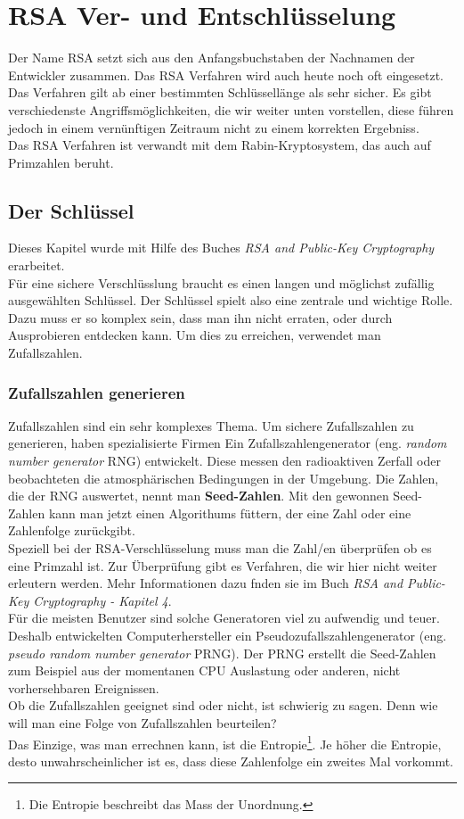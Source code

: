 \newpage
\section{RSA Ver- und Entschlüsselung}
Der Name RSA setzt sich aus den Anfangsbuchstaben der Nachnamen der Entwickler zusammen. Das RSA Verfahren wird auch heute noch oft eingesetzt. Das Verfahren gilt ab einer bestimmten Schlüssellänge als sehr sicher. Es gibt verschiedenste Angriffsmöglichkeiten, die wir weiter unten vorstellen, diese führen jedoch in einem vernünftigen Zeitraum nicht zu einem korrekten Ergebniss.\\
Das RSA Verfahren ist verwandt mit dem Rabin-Kryptosystem, das auch auf Primzahlen beruht. %

\subsection{Der Schlüssel}
Dieses Kapitel wurde mit Hilfe des Buches \textit{RSA and Public-Key Cryptography} erarbeitet.\\[2ex]
%
Für eine sichere Verschlüsslung braucht es einen langen und möglichst zufällig ausgewählten Schlüssel. Der Schlüssel spielt also eine zentrale und wichtige Rolle. Dazu muss er so komplex sein, dass man ihn nicht erraten, oder durch Ausprobieren entdecken kann. Um dies zu erreichen, verwendet man Zufallszahlen.
%
\subsubsection{Zufallszahlen generieren}
Zufallszahlen sind ein sehr komplexes Thema. Um sichere Zufallszahlen zu generieren, haben spezialisierte Firmen Ein Zufallszahlengenerator (eng. \textit{random number generator} RNG) entwickelt. Diese messen den radioaktiven Zerfall oder beobachteten die atmosphärischen Bedingungen in der Umgebung. Die Zahlen, die der RNG auswertet, nennt man \textbf{Seed-Zahlen}. Mit den gewonnen Seed-Zahlen kann man jetzt einen Algorithums füttern, der eine Zahl oder eine Zahlenfolge zurückgibt.\\
Speziell bei der RSA-Verschlüsselung muss man die Zahl/en überprüfen ob es eine Primzahl ist. Zur Überprüfung gibt es Verfahren, die wir hier nicht weiter erleutern werden. Mehr Informationen dazu fnden sie im Buch \textit{RSA and Public-Key Cryptography - Kapitel 4}.\\
%
Für die meisten Benutzer sind solche Generatoren viel zu aufwendig und teuer. Deshalb entwickelten Computerhersteller ein Pseudozufallszahlengenerator (eng. \textit{pseudo random number generator} PRNG). Der PRNG erstellt die Seed-Zahlen zum Beispiel aus der momentanen CPU Auslastung oder anderen, nicht vorhersehbaren Ereignissen.\\
Ob die Zufallszahlen geeignet sind oder nicht, ist schwierig zu sagen. Denn wie will man eine Folge von Zufallszahlen beurteilen?\\
Das Einzige, was man errechnen kann, ist die Entropie\footnote{Die Entropie beschreibt das Mass der Unordnung.}. Je höher die Entropie, desto unwahrscheinlicher ist es, dass diese Zahlenfolge ein zweites Mal vorkommt.
